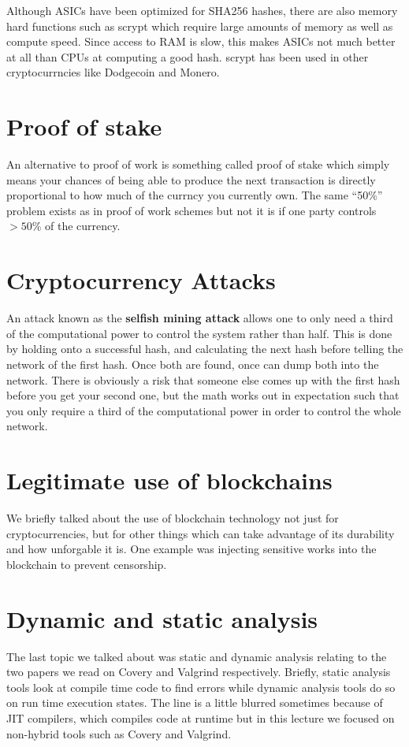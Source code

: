 \documentclass[twoside]{article}
\begin{document}
Although ASICs have been optimized for SHA256 hashes, there are also memory hard functions such as scrypt which require large amounts of memory as well as compute speed. Since access to RAM is slow, this makes ASICs not much better at all than CPUs at computing a good hash. scrypt has been used in other cryptocurrncies like Dodgecoin and Monero.

\section{Proof of stake}
An alternative to proof of work is something called proof of stake which simply means your chances of being able to produce the next transaction is directly proportional to how much of the currncy you currently own. The same ``50\%'' problem exists as in proof of work schemes but not it is if one party controls $>50\%$ of the currency.

\section{Cryptocurrency Attacks}
An attack known as the \textbf{selfish mining attack} allows one to only need a third of the computational power to control the system rather than half. This is done by holding onto a successful hash, and calculating the next hash before telling the network of the first hash. Once both are found, once can dump both into the network. There is obviously a risk that someone else comes up with the first hash before you get your second one, but the math works out in expectation such that you only require a third of the computational power in order to control the whole network.

\section{Legitimate use of blockchains}
We briefly talked about the use of blockchain technology not just for cryptocurrencies, but for other things which can take advantage of its durability and how unforgable it is. One example was injecting sensitive works into the blockchain to prevent censorship.

\section{Dynamic and static analysis}
The last topic we talked about was static and dynamic analysis relating to the two papers we read on Covery and Valgrind respectively. Briefly, static analysis tools look at compile time code to find errors while dynamic analysis tools do so on run time execution states. The line is a little blurred sometimes because of JIT compilers, which compiles code at runtime but in this lecture we focused on non-hybrid tools such as Covery and Valgrind.
\end{document}
